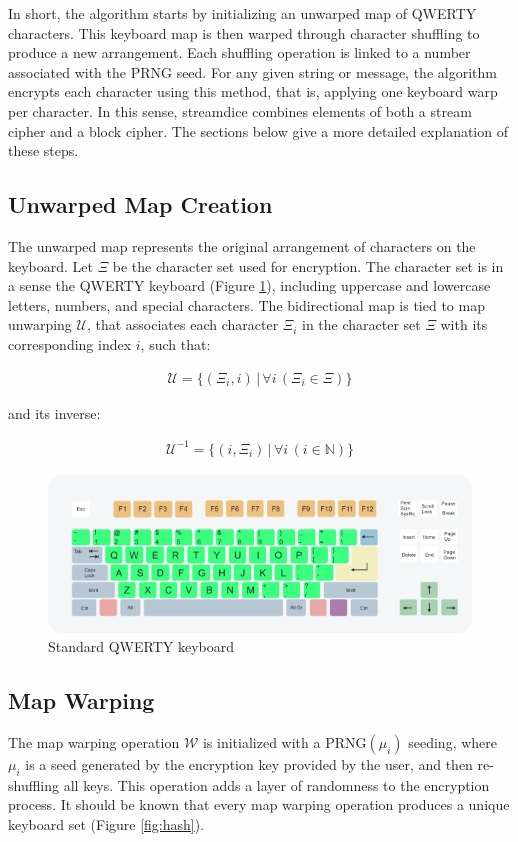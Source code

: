 \documentclass{article}
\begin{document}
In short, the algorithm starts by initializing an unwarped map of QWERTY characters. 
This keyboard map is then warped through character shuffling to produce a new arrangement. 
Each shuffling operation is linked to a number associated with the PRNG seed. 
For any given string or message, the algorithm encrypts each character using this method, that is,
applying one keyboard warp per character. In this sense, streamdice combines elements of both a stream cipher and a block cipher. 
The sections below give a more detailed explanation of these steps.



\subsection{Unwarped Map Creation}
The unwarped map represents the original arrangement of characters on the keyboard. Let \( \Xi \) be the
character set used for encryption. The character set is in a sense the QWERTY keyboard (Figure \ref{fig:keyboard}), 
including uppercase and lowercase letters, numbers, and special characters. 
The bidirectional map is tied to map unwarping \( \mathcal{U} \), that associates each character \( \Xi_i \) in the character set \( \Xi \) 
with its corresponding index \( i \), such that:

\begin{align}
    \mathcal{U} = \{ (\Xi_i, i) \, | \, \forall i \, (\Xi_i \in \Xi) \}
\end{align}

and its inverse:

\begin{align}
    \mathcal{U}^{-1} = \{ (i, \Xi_i) \, | \, \forall i \, (i \in \mathbb{N}) \}
\end{align}


\begin{figure}[h]
  \centering
  \includegraphics[width=0.7\linewidth]{img/qwerty.png}
  \caption{Standard QWERTY keyboard}
  \label{fig:keyboard}
\end{figure}


\subsection{Map Warping}
The map warping operation \( \mathcal{W} \) is initialized with a  \( \text{PRNG}(\mu_i) \) seeding, 
where \( \mu_i \) is a seed generated by the encryption key provided by the user, and then re-shuffling all keys. 
This operation adds a layer of randomness to the encryption process. It should be known that every map warping operation
produces a unique keyboard set (Figure \ref{fig:hash}).
\end{document}

